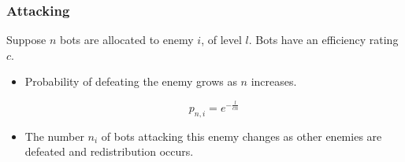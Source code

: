\documentclass{beamer}
\begin{document}
\begin{frame}
    \frametitle{Attacking}

    Suppose $n$ bots are allocated to enemy $i$, of level $l$.
    Bots have an efficiency rating $c$.

    \begin{center}
    \end{center}

    \pause

    \begin{itemize}
        \item
            Probability of defeating the enemy grows as $n$ increases.

            \begin{equation*}
                p_{n,i} = e^{-\frac{l}{cn}}
            \end{equation*}
        \item
            The number $n_i$ of bots attacking this enemy changes as other
            enemies are defeated and redistribution occurs.
    \end{itemize}
\end{frame}
\end{document}
